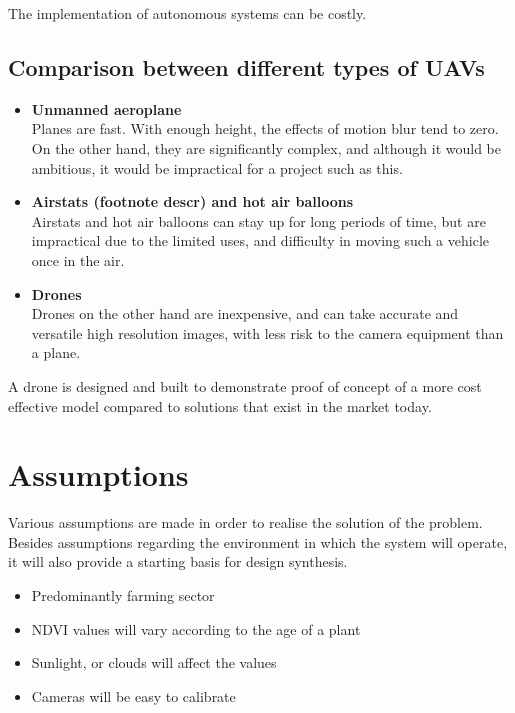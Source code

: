 \noindent
The implementation of autonomous systems can be costly. 

\subsection{Comparison between different types of UAVs}

\begin{itemize}
    \item \textbf{Unmanned aeroplane}\\
    Planes are fast. With enough height, the effects of motion blur tend to zero. On the other hand, they are significantly complex, and although it would be ambitious, it would be impractical for a project such as this.
    \item \textbf{Airstats (footnote descr) and hot air balloons}\\
    Airstats and hot air balloons can stay up for long periods of time, but are impractical due to the limited uses, and difficulty in moving such a vehicle once in the air.
    \item \textbf{Drones}\\
    Drones on the other hand are inexpensive, and can take accurate and versatile high resolution images, with less risk to the camera equipment than a plane.\\
    
\end{itemize}

\noindent
A drone is designed and built to demonstrate proof of concept of a more cost effective model compared to solutions that exist in the market today.\\

\section{Assumptions}

Various assumptions are made in order to realise the solution of the problem. Besides assumptions regarding the environment in which the system will operate, it will also provide a starting basis for design synthesis.

\begin{itemize}
    \item Predominantly farming sector
    \item NDVI values will vary according to the age of a plant
    \item Sunlight, or clouds will affect the values
    \item Cameras will be easy to calibrate
\end{itemize}

